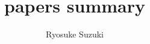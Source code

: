 \documentclass[12pt,fleqn,dvipdfmx]{jarticle}
\begin{document}
  \title{papers summary}
  \author{Ryosuke Suzuki}
  \date{}
  \maketitle
  \tableofcontents
  \newpage


  

  
\end{document}
